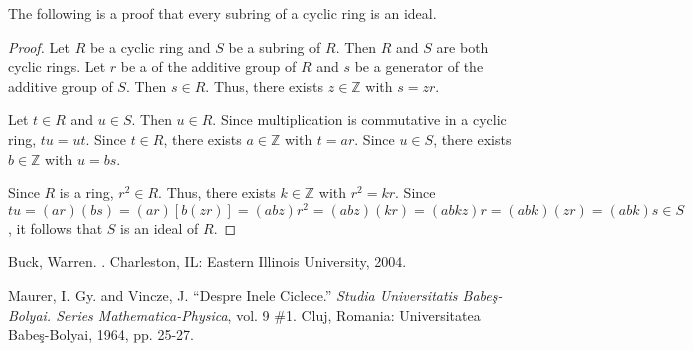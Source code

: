 \documentclass[12pt]{article}
\begin{document}

The following is a proof that every subring of a cyclic ring is an ideal.

\begin{proof}
Let $R$ be a cyclic ring and $S$ be a subring of $R$.  Then $R$ and $S$ are both cyclic rings.  Let $r$ be a  of the additive group of $R$ and $s$ be a generator of the additive group of $S$.  Then $s \in R$.  Thus, there exists $z \in \mathbb{Z}$ with $s=zr$.

Let $t \in R$ and $u \in S$.  Then $u \in R$.  Since multiplication is commutative in a cyclic ring, $tu=ut$.  Since $t \in R$, there exists $a \in {\mathbb Z}$ with $t=ar$.  Since $u \in S$, there exists $b \in {\mathbb Z}$ with $u=bs$.

Since $R$ is a ring, $r^2 \in R$.  Thus, there exists $k \in {\mathbb Z}$ with $r^2=kr$.  Since $tu=(ar)(bs)=(ar)[b(zr)]=(abz)r^2=(abz)(kr)=(abkz)r=(abk)(zr)=(abk)s \in S$, it follows that $S$ is an ideal of $R$.
\end{proof}

\begin{thebibliography}{9}
 Buck, Warren. \emph{}. Charleston, IL: Eastern Illinois University, 2004.

 Maurer, I. Gy. and Vincze, J. ``Despre Inele Ciclece.'' \emph{Studia Universitatis Babe\c{s}-Bolyai. Series Mathematica-Physica}, vol. 9 \#1. Cluj, Romania: Universitatea Babe\c{s}-Bolyai, 1964, pp. 25-27.
\end{thebibliography}
\end{document}
